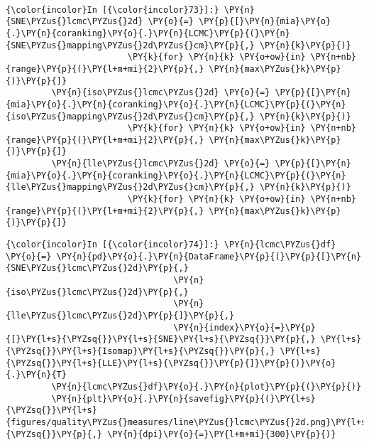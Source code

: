     \begin{center}
    \end{center}
    { \hspace*{\fill} \\}

    \begin{Verbatim}[commandchars=\\\{\}]
{\color{incolor}In [{\color{incolor}73}]:} \PY{n}{SNE\PYZus{}lcmc\PYZus{}2d} \PY{o}{=} \PY{p}{[}\PY{n}{mia}\PY{o}{.}\PY{n}{coranking}\PY{o}{.}\PY{n}{LCMC}\PY{p}{(}\PY{n}{SNE\PYZus{}mapping\PYZus{}2d\PYZus{}cm}\PY{p}{,} \PY{n}{k}\PY{p}{)}
                        \PY{k}{for} \PY{n}{k} \PY{o+ow}{in} \PY{n+nb}{range}\PY{p}{(}\PY{l+m+mi}{2}\PY{p}{,} \PY{n}{max\PYZus{}k}\PY{p}{)}\PY{p}{]}
         \PY{n}{iso\PYZus{}lcmc\PYZus{}2d} \PY{o}{=} \PY{p}{[}\PY{n}{mia}\PY{o}{.}\PY{n}{coranking}\PY{o}{.}\PY{n}{LCMC}\PY{p}{(}\PY{n}{iso\PYZus{}mapping\PYZus{}2d\PYZus{}cm}\PY{p}{,} \PY{n}{k}\PY{p}{)}
                        \PY{k}{for} \PY{n}{k} \PY{o+ow}{in} \PY{n+nb}{range}\PY{p}{(}\PY{l+m+mi}{2}\PY{p}{,} \PY{n}{max\PYZus{}k}\PY{p}{)}\PY{p}{]}
         \PY{n}{lle\PYZus{}lcmc\PYZus{}2d} \PY{o}{=} \PY{p}{[}\PY{n}{mia}\PY{o}{.}\PY{n}{coranking}\PY{o}{.}\PY{n}{LCMC}\PY{p}{(}\PY{n}{lle\PYZus{}mapping\PYZus{}2d\PYZus{}cm}\PY{p}{,} \PY{n}{k}\PY{p}{)}
                        \PY{k}{for} \PY{n}{k} \PY{o+ow}{in} \PY{n+nb}{range}\PY{p}{(}\PY{l+m+mi}{2}\PY{p}{,} \PY{n}{max\PYZus{}k}\PY{p}{)}\PY{p}{]}
\end{Verbatim}

    \begin{Verbatim}[commandchars=\\\{\}]
{\color{incolor}In [{\color{incolor}74}]:} \PY{n}{lcmc\PYZus{}df} \PY{o}{=} \PY{n}{pd}\PY{o}{.}\PY{n}{DataFrame}\PY{p}{(}\PY{p}{[}\PY{n}{SNE\PYZus{}lcmc\PYZus{}2d}\PY{p}{,}
                                 \PY{n}{iso\PYZus{}lcmc\PYZus{}2d}\PY{p}{,}
                                 \PY{n}{lle\PYZus{}lcmc\PYZus{}2d}\PY{p}{]}\PY{p}{,}
                                 \PY{n}{index}\PY{o}{=}\PY{p}{[}\PY{l+s}{\PYZsq{}}\PY{l+s}{SNE}\PY{l+s}{\PYZsq{}}\PY{p}{,} \PY{l+s}{\PYZsq{}}\PY{l+s}{Isomap}\PY{l+s}{\PYZsq{}}\PY{p}{,} \PY{l+s}{\PYZsq{}}\PY{l+s}{LLE}\PY{l+s}{\PYZsq{}}\PY{p}{]}\PY{p}{)}\PY{o}{.}\PY{n}{T}
         \PY{n}{lcmc\PYZus{}df}\PY{o}{.}\PY{n}{plot}\PY{p}{(}\PY{p}{)}
         \PY{n}{plt}\PY{o}{.}\PY{n}{savefig}\PY{p}{(}\PY{l+s}{\PYZsq{}}\PY{l+s}{figures/quality\PYZus{}measures/line\PYZus{}lcmc\PYZus{}2d.png}\PY{l+s}{\PYZsq{}}\PY{p}{,} \PY{n}{dpi}\PY{o}{=}\PY{l+m+mi}{300}\PY{p}{)}
\end{Verbatim}


